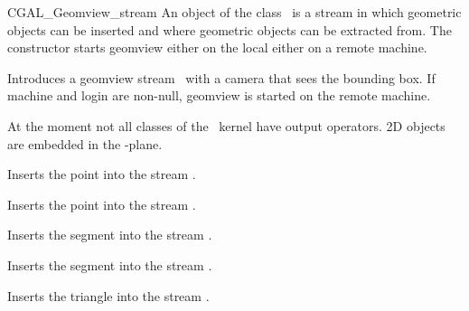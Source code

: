 \begin{ccClass}{CGAL_Geomview_stream}
\ccDefinition
An object of the class \ccClassName\ is a stream in which geometric
objects can be inserted and where geometric objects can be extracted
from. The constructor starts geomview either on the local either on
a remote machine.


\ccThreeToTwo
\ccCreation
{}

{Introduces a geomview stream \ccVar\ with a camera that sees the
bounding box. If machine and login are non-null, geomview is started
on the remote machine.}



\ccOperations



\def\ccTagRmEigenClassName{\ccFalse}

At the moment not all classes of the \cgal\ kernel have output
operators. 2D objects are embedded in the -plane.

{Inserts the point  into the stream \ccVar.}


{Inserts the point  into the stream \ccVar.}


{Inserts the segment  into the stream \ccVar.}

{Inserts the segment  into the stream \ccVar.}


{Inserts the triangle  into the stream \ccVar.}



\end{ccClass}
